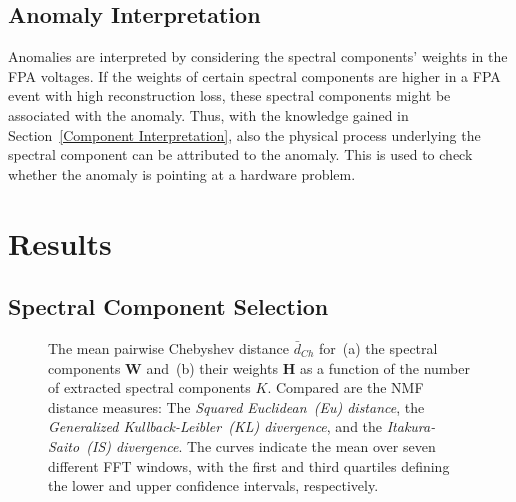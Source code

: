 \documentclass[lettersize,journal]{IEEEtran}
\begin{document}
\subsection{Anomaly Interpretation}
Anomalies are interpreted by considering the spectral components' weights in the FPA voltages.
If the weights of certain spectral components are higher in a FPA event with high reconstruction loss, these spectral components might be associated with the anomaly.
Thus, with the knowledge gained in Section~\ref{Component Interpretation}, also the physical process underlying the spectral component can be attributed to the anomaly.
This is used to check whether the anomaly is pointing at a hardware problem.

\section{Results} \label{Results}


\subsection{Spectral Component Selection\label{Model Selection}}

\begin{figure}[h!]
\def\scalesize{0.7}
\centering 
\def\scalesize{0.7}
\centering 
\caption{The mean pairwise Chebyshev distance $\bar{d}_{Ch}$ for~(a) the spectral components $\mathbf{W}$ and~(b) their weights $\mathbf{H}$ as a function of the number of extracted spectral components $K$. Compared are the NMF distance measures: The \textit{Squared Euclidean~(Eu) distance}, the \textit{Generalized Kullback-Leibler~(KL) divergence}, and the \textit{Itakura-Saito~(IS) divergence}. The curves indicate the mean over seven different FFT windows, with the first and third quartiles defining the lower and upper confidence intervals, respectively.}
\label{perf_measures}
\end{figure}
\end{document}

